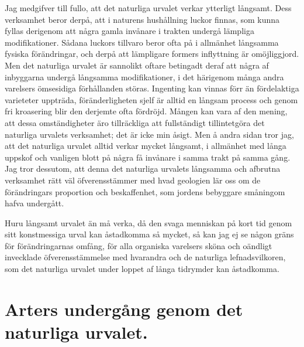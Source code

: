 Jag medgifver till fullo, att det naturliga urvalet verkar ytterligt långsamt. Dess verksamhet beror derpå, att i naturens hushållning luckor finnas, som kunna fyllas derigenom att några gamla invånare i trakten undergå lämpliga modifikationer. Sådana luckors tillvaro beror ofta på i allmänhet långsamma fysiska förändringar, och derpå att lämpligare formers inflyttning är omöjliggjord. Men det naturliga urvalet är sannolikt oftare betingadt deraf att några af inbyggarna undergå långsamma modifikationer, i det härigenom många andra varelsers ömsesidiga förhållanden störas. Ingenting kan vinnas förr än fördelaktiga varieteter uppträda, föränderligheten sjelf är alltid en långsam process och genom fri kroasering blir den derjemte ofta fördröjd. Mången kan vara af den mening, att dessa omständigheter äro tillräckliga att fullständigt tillintetgöra det naturliga urvalets verksamhet; det är icke min åsigt. Men å andra sidan tror jag, att det naturliga urvalet alltid verkar mycket långsamt, i allmänhet med långa uppskof och vanligen blott på några få invånare i samma trakt på samma gång. Jag tror dessutom, att denna det naturliga urvalets långsamma och afbrutna verksamhet rätt väl öfverensstämmer med hvad geologien lär oss om de förändringars proportion och beskaffenhet, som jordens bebyggare småningom hafva undergått.

Huru långsamt urvalet än må verka, då den svaga menniskan på kort tid genom sitt konstmessiga urval kan åstadkomma så mycket, så kan jag ej se någon gräns för förändringarnas omfång, för alla organiska varelsers sköna och oändligt invecklade öfverensstämmelse med hvarandra och de naturliga lefnadsvilkoren, som det naturliga urvalet under loppet af långa tidrymder kan åstadkomma.



\section[Arters undergång]{Arters undergång genom det naturliga urvalet.}

